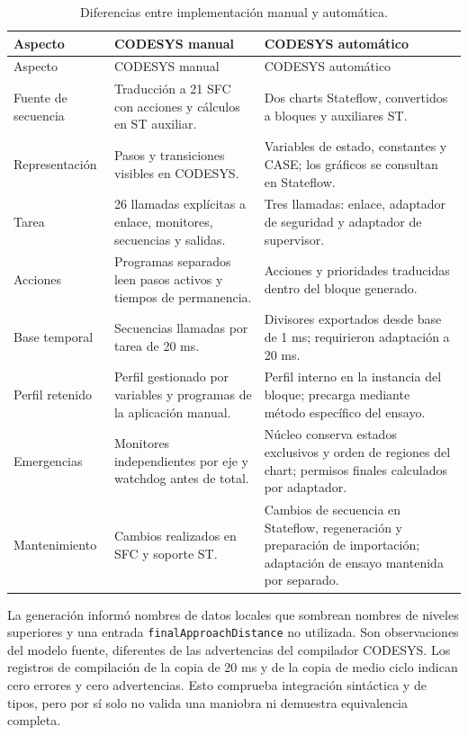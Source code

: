 \documentclass[a4paper,10pt,onecolumn,journal]{ieeeconf}
\numberwithin{equation}{section}
\begin{document}
{\footnotesize
{}
\begin{longtable}{L{3.0cm} L{5.8cm} L{5.8cm}}
\caption{Diferencias entre implementación manual y automática.}\label{tab:manual_auto_st}\\
\toprule Aspecto & CODESYS manual & CODESYS automático\\\midrule
\endfirsthead
\toprule Aspecto & CODESYS manual & CODESYS automático\\\midrule
\endhead
Fuente de secuencia & Traducción a 21 SFC con acciones y cálculos en ST auxiliar. & Dos charts Stateflow, convertidos a bloques y auxiliares ST.\\
Representación & Pasos y transiciones visibles en CODESYS. & Variables de estado, constantes y CASE; los gráficos se consultan en Stateflow.\\
Tarea & 26 llamadas explícitas a enlace, monitores, secuencias y salidas. & Tres llamadas: enlace, adaptador de seguridad y adaptador de supervisor.\\
Acciones & Programas separados leen pasos activos y tiempos de permanencia. & Acciones y prioridades traducidas dentro del bloque generado.\\
Base temporal & Secuencias llamadas por tarea de 20 ms. & Divisores exportados desde base de 1 ms; requirieron adaptación a 20 ms.\\
Perfil retenido & Perfil gestionado por variables y programas de la aplicación manual. & Perfil interno en la instancia del bloque; precarga mediante método específico del ensayo.\\
Emergencias & Monitores independientes por eje y watchdog antes de total. & Núcleo conserva estados exclusivos y orden de regiones del chart; permisos finales calculados por adaptador.\\
Mantenimiento & Cambios realizados en SFC y soporte ST. & Cambios de secuencia en Stateflow, regeneración y preparación de importación; adaptación de ensayo mantenida por separado.\\
\bottomrule
\end{longtable}}

La generación informó nombres de datos locales que sombrean nombres de niveles superiores y una entrada \texttt{finalApproachDistance} no utilizada. Son observaciones del modelo fuente, diferentes de las advertencias del compilador CODESYS. Los registros de compilación de la copia de 20 ms y de la copia de medio ciclo indican cero errores y cero advertencias. Esto comprueba integración sintáctica y de tipos, pero por sí solo no valida una maniobra ni demuestra equivalencia completa.
\end{document}
